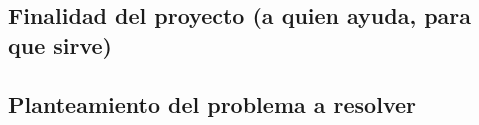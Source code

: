 

  \subsection{Finalidad del proyecto (a quien ayuda, para que sirve)}  

  \newpage



  \subsection{Planteamiento del problema a resolver}  

  \newpage


